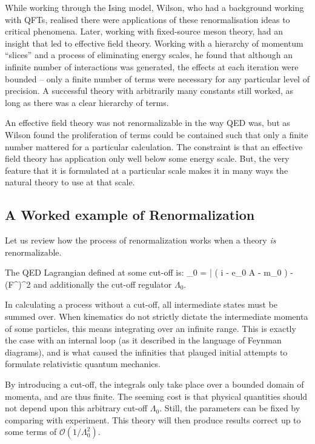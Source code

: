 While working through the Ising model, Wilson, who had a background working with QFTs, realised there were applications of these renormalisation ideas to critical phenomena.    Later, working with fixed-source meson theory, had an insight that led to effective field theory.  Working with a hierarchy of momentum ``slices'' and a process of eliminating energy scales, he found that although an infinite number of interactions was generated, the effects at each iteration were bounded -- only a finite number of terms were necessary for any particular level of precision.  A successful theory with arbitrarily many constants still worked, as long as there was a clear hierarchy of terms.

An effective field theory was not renormalizable in the way QED was, but as Wilson found the proliferation of terms could be contained such that only a finite number mattered for a particular calculation.  The constraint is that an effective field theory has application only well below some energy scale.  But, the very feature that it is formulated at a particular scale makes it in many ways the natural theory to use at that scale.


\subsection{A Worked example of Renormalization}
Let us review how the process of renormalization works when a theory {\it is} renormalizable.


The QED Lagrangian defined at some cut-off is:
\beq
	_0 = 
		\bar{\Psi} \left( i \partial \cdot \gamma - e_0 A \cdot \gamma - m_0 \right) \Psi -  (F^{\mu\nu})^2 
\eeq 
and additionally the cut-off regulator $\Lambda_0$.  

In calculating a process without a cut-off, all intermediate states must be summed over.  When kinematics do not strictly dictate the intermediate momenta of some particles, this means integrating over an infinite range.  This is exactly the case with an internal loop (as it described in the language of Feynman diagrams), and is what caused the infinities that plauged initial attempts to formulate relativistic quantum mechanics. 

By introducing a cut-off, the integrals only take place over a bounded domain of momenta, and are thus finite.  The seeming cost is that physical quantities should not depend upon this arbitrary cut-off $\Lambda_0$.  Still, the parameters can be fixed by comparing with experiment.  This theory will then produce results correct up to some terms of $\mathcal{O}(1/\Lambda_0^2)$.

